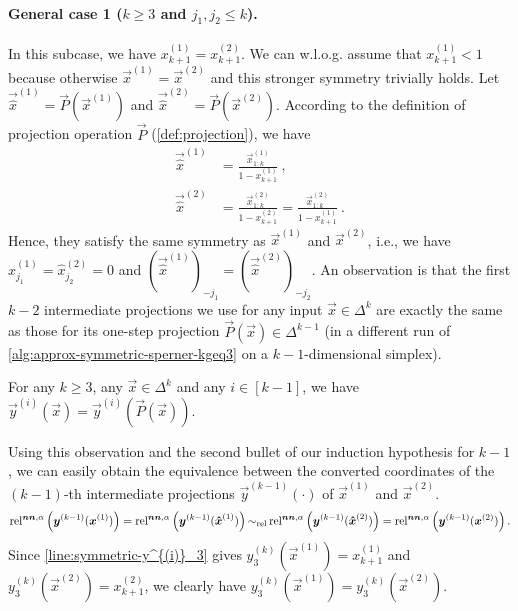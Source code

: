 \paragraph{General case 1 ($k\geq 3$ and $j_1,j_2\leq k$).}
In this subcase, we have $x^{(1)}_{k+1}=x^{(2)}_{k+1}$.
We can w.l.o.g. assume that $x^{(1)}_{k+1}<1$ because otherwise $\vec{x}^{(1)}=\vec{x}^{(2)}$ and this stronger symmetry trivially holds.
Let $\vec{\hat{x}}^{(1)} = \vec{P}(\vec{x}^{(1)})$ and $\vec{\hat{x}}^{(2)} = \vec{P}(\vec{x}^{(2)})$.
According to the definition of projection operation $\vec{P}$ (\cref{def:projection}), we have 
\begin{align*}
    \vec{\hat{x}}^{(1)} &= \frac{\vec{x}^{(1)}_{1:k}}{1-x^{(1)}_{k+1}}~, \\
    \vec{\hat{x}}^{(2)} &= \frac{\vec{x}^{(2)}_{1:k}}{1-x^{(2)}_{k+1}} = \frac{\vec{x}^{(2)}_{1:k}}{1-x^{(1)}_{k+1}}~. 
\end{align*}
Hence, they satisfy the same symmetry as $\vec{x}^{(1)}$ and $\vec{x}^{(2)}$, i.e.,
we have $\hat{x}^{(1)}_{j_1}=\hat{x}^{(2)}_{j_2}=0$ and $(\vec{\hat{x}}^{(1)})_{-j_1}=(\vec{\hat{x}}^{(2)})_{-j_2}$. 
An observation is that the first $k-2$ intermediate projections we use for any input $\vec{x}\in \Delta^k$ 
are exactly the same as those for its one-step projection $\vec{P}(\vec{x})\in \Delta^{k-1}$ (in a different run of \cref{alg:approx-symmetric-sperner-kgeq3} on a $k-1$-dimensional simplex).
\begin{observation}
    \label{obs:equal-y-on-projection}
    For any $k\geq 3$, any $\vec{x}\in \Delta^k$ and any $i\in [k-1]$, we have $\vec{y}^{(i)}(\vec{x}) = \vec{y}^{(i)}(\vec{P}(\vec{x}))$. 
\end{observation}
\noindent Using this observation and the second bullet of our induction hypothesis for $k-1$, we can easily obtain the equivalence between the converted coordinates of the $(k-1)$-th intermediate projections $\vec{y}^{(k-1)}(\cdot)$ of $\vec{x}^{(1)}$ and $\vec{x}^{(2)}$.
\begin{align}
    \operatorname*{rel^{\boldsymbol{nn},\alpha}}\left(\boldsymbol{y}^{(k-1)}(\boldsymbol{x}^{(1)})\right) 
    = 
    \operatorname*{rel^{\boldsymbol{nn},\alpha}}\left(\boldsymbol{y}^{(k-1)}(\boldsymbol{\hat{x}}^{(1)})\right) 
    \operatorname*{\sim_{\rm rel}}
    \operatorname*{rel^{\boldsymbol{nn},\alpha}}\left(\boldsymbol{y}^{(k-1)}(\boldsymbol{\hat{x}}^{(2)})\right) 
    = 
    \operatorname*{rel^{\boldsymbol{nn},\alpha}}\left(\boldsymbol{y}^{(k-1)}(\boldsymbol{x}^{(2)})\right).
    \label{eqn:symmetric-converted-induction-hypothesis}
\end{align}
Since \cref{line:symmetric-y^{(i)}_3} gives $y^{(k)}_3(\vec{x}^{(1)}) = x^{(1)}_{k+1}$ and $y^{(k)}_3(\vec{x}^{(2)}) = x^{(2)}_{k+1}$, we clearly have $y^{(k)}_3(\vec{x}^{(1)})=y^{(k)}_3(\vec{x}^{(2)})$.
